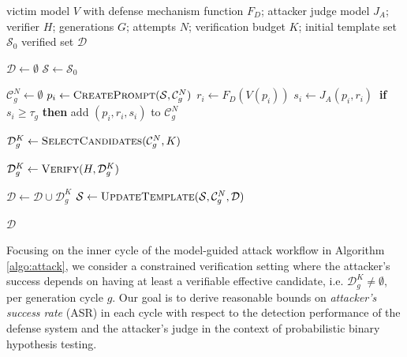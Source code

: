 \documentclass[conference,compsoc]{IEEEtran}
\begin{document}
\begin{algorithm}[t]
    \caption{Generic Model-Guided Attack Workflow}
    \label{algo:attack}
    \small
    \begin{algorithmic}[1]
        \Require victim model $V$ with defense mechanism function $F_D$; attacker judge model $J_A$; verifier $H$;
        generations $G$; attempts $N$; verification budget $K$;
        initial template set $\mathcal{S}_0$
        \Ensure verified set $\mathcal{D}$

        \State $\mathcal{D} \gets \emptyset$
        \State $\mathcal{S} \gets \mathcal{S}_0$

        \State $\mathcal{C}^N_g \gets \emptyset$ 
        \State $p_i \gets \textsc{CreatePrompt}(\mathcal{S}, \mathcal{C}^N_g)$
        \State $r_i \gets F_D(V(p_i))$  
        \State $s_i \gets J_A(p_i,r_i)~$ 
        \State \textbf{if} $s_i \ge \tau_g$ \textbf{then} add $(p_i,r_i,s_i)$ to $\mathcal{C}^N_g$
        \EndFor

        \State $\mathcal{D}_g^{K} \gets \textsc{SelectCandidates}(\mathcal{C}^N_g, K)$
        \vskip 4pt

        \State $\mathcal{D}_g^{K} \gets \textsc{Verify}(H,\mathcal{D}_g^{K})$

        \State $\mathcal{D} \gets \mathcal{D} \cup \mathcal{D}_g^{K}$
        \State $\mathcal{S} \gets \textsc{UpdateTemplate}(\mathcal{S}, \mathcal{C}^N_g, \mathcal{D})$
        \EndFor

        \State \Return $\mathcal{D}$
    \end{algorithmic}
    \normalsize
\end{algorithm}

Focusing on the inner cycle of the model-guided attack workflow in Algorithm \ref{algo:attack}, we consider a constrained verification setting where the attacker's success depends on having at least a verifiable effective candidate, i.e. $\mathcal{D}_g^K \ne \emptyset$, per generation cycle $g$.
 Our goal is to derive reasonable bounds on \textit{attacker's success rate} (ASR) in each cycle with respect to the detection performance of the defense system and the attacker's judge in the context of probabilistic binary hypothesis testing.
\end{document}
